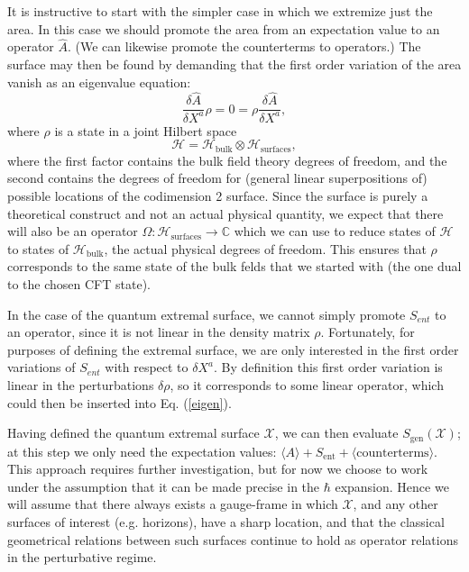 \documentclass[12pt]{article}
\theoremstyle{remark}
\numberwithin{equation}{section}
\numberwithin{equation}{section}
\begin{document}
It is instructive to start with the simpler case in which we extremize just the area.  In this case we should promote the area from an expectation value to an operator $\hat{A}$.  (We can likewise promote the counterterms to operators.)  The surface may then be found by demanding that the first order variation of the area vanish as an eigenvalue equation:
\begin{equation}\label{eigen}
\frac{\delta \hat{A}}{\delta X^a} \rho  = 0 = \rho \frac{\delta \hat{A}}{\delta X^a},
\end{equation}
where $\rho$ is a state in a joint Hilbert space
\begin{equation}
\mathcal{H} = \mathcal{H}_\mathrm{bulk}\otimes\mathcal{H}_\mathrm{surfaces},
\end{equation}
where the first factor contains the bulk field theory degrees of freedom, and the second contains the degrees of freedom for (general linear superpositions of) possible locations of the codimension 2 surface.  Since the surface is purely a theoretical construct and not an actual physical quantity, we expect that there will also be an operator $\Omega: \mathcal{H}_\mathrm{surfaces} \to \mathbb{C}$ which we can use to reduce states of $\mathcal{H}$ to states of $\mathcal{H}_\mathrm{bulk}$, the actual physical degrees of freedom.  This ensures that $\rho$ corresponds to the same state of the bulk felds that we started with (the one dual to the chosen CFT state).

In the case of the quantum extremal surface, we cannot simply promote $S_{ent}$ to an operator, since it is not linear in the density matrix $\rho$.  Fortunately, for purposes of defining the extremal surface, we are only interested in the first order variations of $S_{ent}$ with respect to $\delta X^a$.  By definition this first order variation is linear in the perturbations $\delta \rho$, so it corresponds to some linear operator, which could then be inserted into Eq. (\ref{eigen}). 

Having defined the quantum extremal surface $\mathcal{X}$, we can then evaluate $S_\mathrm{gen}(\mathcal{X})$; at this step we only need the expectation values: $\langle A \rangle + S_\mathrm{ent} + \langle \mathrm{counterterms} \rangle$.  This approach requires further investigation, but for now we choose to work under the assumption that it can be made precise in the $\hbar$ expansion.  Hence we will assume that there always exists a gauge-frame in which $\mathcal{X}$, and any other surfaces of interest (e.g. horizons), have a sharp location, and that the classical geometrical relations between such surfaces continue to hold as operator relations in the perturbative regime.
\end{document}
